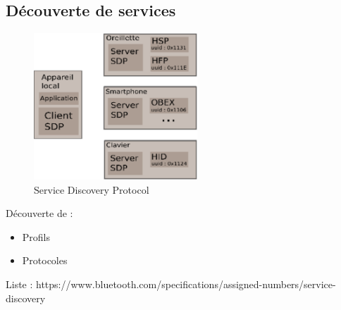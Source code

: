 \subsection{Découverte de services}
\begin{frame}
\begin{minipage}[t]{0.70\linewidth}

\begin{figure}
\includegraphics[height=5.5cm]{sdp.png}
\caption{Service Discovery Protocol}
\end{figure}


\end{minipage}
\begin{minipage}[t]{0.27\linewidth}
\begin{block}{Découverte de :}
\begin{itemize}
\item Profils
\item Protocoles
\end{itemize}
\end{block}

\end{minipage}
{\tiny Liste : https://www.bluetooth.com/specifications/assigned-numbers/service-discovery}
\end{frame}
